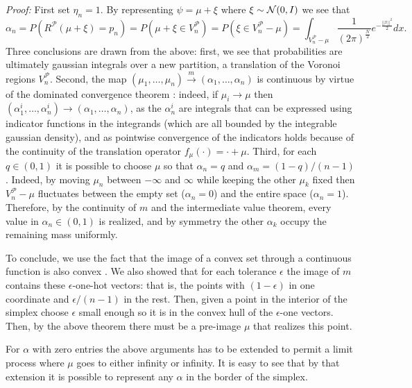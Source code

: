 \documentclass{article}
\begin{document}
\textit{Proof:} First set $\eta_n=1$. By representing $\psi = \mu + \xi$ where $\xi\sim\mathcal{N}(0, I)$ we see that
$$\alpha_n = P(R^\mathcal{P}(\mu + \xi) = p_n ) = P(\mu + \xi \in V^\mathcal{P}_{n}) = P(\xi \in V^\mathcal{P}_{n} - \mu) =  \int_{V^\mathcal{P}_{n} - \mu} \frac{1}{(2\pi)^\frac{N}{2}}e^{-\frac{||x||^2}{2}} dx.$$
Three conclusions are drawn from the above: first, we see that probabilities are ultimately gaussian integrals over a new partition, a translation of the Voronoi regions $V^\mathcal{P}_{n}$. Second,
the map $(\mu_1,\ldots,  \mu_n)\xrightarrow{m} (\alpha_1,\ldots, \alpha_n)$ is continuous by virtue of the dominated convergence theorem \cite{browder2012mathematical}: indeed, if $\mu_i\rightarrow \mu$ then $(\alpha^i_1,\ldots, \alpha^i_n) \rightarrow (\alpha_1,\ldots, \alpha_n)$, as the $\alpha^i_n$ are integrals that can be expressed using indicator functions in the integrands (which are all bounded by the integrable gaussian density), and as pointwise convergence of the indicators holds because of the continuity of the translation operator $f_\mu(\cdot) = \cdot + \mu$. Third, for each $q\in(0,1)$ it is possible to choose $\mu$ so that $\alpha_n =q$ and $\alpha_m = (1-q)/(n-1)$. Indeed, by moving $\mu_n$ between $-\infty$ and $\infty$ while keeping the other $\mu_k$ fixed then $V^\mathcal{P}_{n} - \mu$ fluctuates between the empty set ($\alpha_n =0$) and the entire space ($\alpha_n=1$). Therefore, by the continuity of $m$ and the intermediate value theorem, every value in $\alpha_n\in (0,1)$ is realized, and by symmetry the other $\alpha_k$ occupy the remaining mass uniformly. 

To conclude, we use the fact that the image of a convex set through a continuous function is also convex \cite{Rockafellar70}. We also showed that for each tolerance $\epsilon$ the image of $m$ contains these $\epsilon$-one-hot vectors: that is, the points with $(1-\epsilon)$ in one coordinate and $\epsilon/ (n-1)$ in the rest. Then, given a point in the interior of the simplex choose $\epsilon$ small enough so it is in the convex hull of the $\epsilon$-one vectors. Then, by the above theorem there must be a pre-image $\mu$ that realizes this point.

For $\alpha$ with zero entries the above arguments has to be extended to permit a limit process where $\mu$ goes to either infinity or infinity. It is easy to see that by that extension it is possible to represent any $\alpha$ in the border of the simplex.
\end{document}
